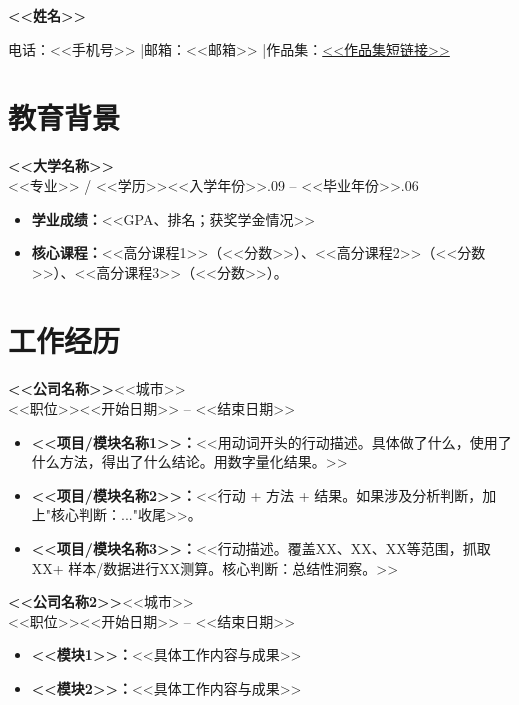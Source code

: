 \documentclass[a4paper, 10pt]{article}
\newcommand{\workentry}[4]{%
  \noindent\textbf{#1}\hfill{\small #2}\\[-2pt]
  {\kaishu\small #3}\hfill{\kaishu\small #4}\par\vspace{1.5pt}%
}
\begin{document}
\noindent
\begin{minipage}{\textwidth}
  \centering
  {\Large\bfseries <<姓名>>\par}
  \vspace{2pt}
  {\small 电话：<<手机号>> \enspace|\enspace 邮箱：<<邮箱>> \enspace|\enspace 作品集：\href{<<作品集URL>>}{<<作品集短链接>>}\par}
\end{minipage}

\vspace{2pt}

\section{教育背景}

\workentry{<<大学名称>>}{}{<<专业>> / <<学历>>}{<<入学年份>>.09 -- <<毕业年份>>.06}

\begin{itemize}
  \item \textbf{学业成绩：}<<GPA、排名；获奖学金情况>>
  \item \textbf{核心课程：}<<高分课程1>>（<<分数>>）、<<高分课程2>>（<<分数>>）、<<高分课程3>>（<<分数>>）。
\end{itemize}

\section{工作经历}

\workentry{<<公司名称>>}{<<城市>>}{<<职位>>}{<<开始日期>> -- <<结束日期>>}

\begin{itemize}
  \item \textbf{<<项目/模块名称1>>：}<<用动词开头的行动描述。具体做了什么，使用了什么方法，得出了什么结论。用数字量化结果。>>
  \item \textbf{<<项目/模块名称2>>：}<<行动 + 方法 + 结果。如果涉及分析判断，加上"核心判断：..."收尾>>。
  \item \textbf{<<项目/模块名称3>>：}<<行动描述。覆盖XX、XX、XX等范围，抓取XX+ 样本/数据进行XX测算。核心判断：总结性洞察。>>
\end{itemize}

\workentry{<<公司名称2>>}{<<城市>>}{<<职位>>}{<<开始日期>> -- <<结束日期>>}

\begin{itemize}
  \item \textbf{<<模块1>>：}<<具体工作内容与成果>>
  \item \textbf{<<模块2>>：}<<具体工作内容与成果>>
\end{itemize}
\end{document}
